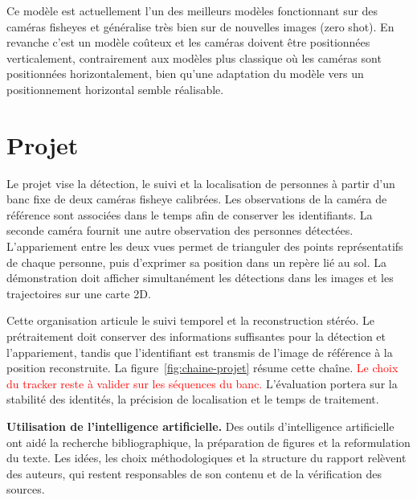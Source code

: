 \documentclass[11pt,a4paper]{article}
\begin{document}
Ce modèle est actuellement l'un des meilleurs modèles fonctionnant sur des caméras fisheyes et généralise très bien sur de nouvelles images (zero shot). En revanche c'est un modèle coûteux et les caméras doivent être positionnées verticalement, contrairement aux modèles plus classique où les caméras sont positionnées horizontalement, bien qu'une adaptation du modèle vers un positionnement horizontal semble réalisable.



\Needspace{.83\textheight}
\section{Projet}



\label{sec:projet}
Le projet vise la détection, le suivi et la localisation de personnes à partir d'un banc fixe de deux caméras fisheye calibrées. Les observations de la caméra de référence sont associées dans le temps afin de conserver les identifiants. La seconde caméra fournit une autre observation des personnes détectées. L'appariement entre les deux vues permet de trianguler des points représentatifs de chaque personne, puis d'exprimer sa position dans un repère lié au sol. La démonstration doit afficher simultanément les détections dans les images et les trajectoires sur une carte 2D.

Cette organisation articule le suivi temporel et la reconstruction stéréo. Le prétraitement doit conserver des informations suffisantes pour la détection et l'appariement, tandis que l'identifiant est transmis de l'image de référence à la position reconstruite. La figure~\ref{fig:chaine-projet} résume cette chaîne. \textcolor{red}{Le choix du tracker reste à valider sur les séquences du banc.} L'évaluation portera sur la stabilité des identités, la précision de localisation et le temps de traitement.





\medskip\noindent\textbf{Utilisation de l'intelligence artificielle.}
Des outils d'intelligence artificielle ont aidé la recherche bibliographique, la préparation de figures et la reformulation du texte. Les idées, les choix méthodologiques et la structure du rapport relèvent des auteurs, qui restent responsables de son contenu et de la vérification des sources.


\begingroup
\small
\printbibliography[title={Bibliographie}]
\endgroup
\end{document}
